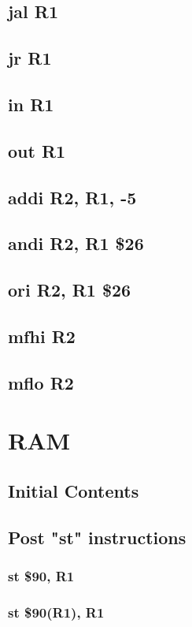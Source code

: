 \documentclass{article}
\begin{document}
    \subsection{jal R1} \label{jal_sequence}
        
    \subsection{jr R1} \label{jr_sequence}
        
    \subsection{in R1} \label{in_sequence}
        
    \subsection{out R1} \label{out_sequence}
        
    \subsection{addi R2, R1, -5} \label{addi_sequence}
        
    \subsection{andi R2, R1 \$26} \label{andi_sequence}
        
    \subsection{ori R2, R1 \$26} \label{ori_sequence}
        
    \subsection{mfhi R2} \label{mfhi_sequence}
        
    \subsection{mflo R2} \label{mflo_sequence}
        
\section{RAM}
    \subsection{Initial Contents} \label{ram_init}
    \subsection{Post "st" instructions}
        \subsubsection{st \$90, R1} \label{ram_st_case_1}
            
        \subsubsection{st \$90(R1), R1} \label{ram_st_case_2}
            
\end{document}
